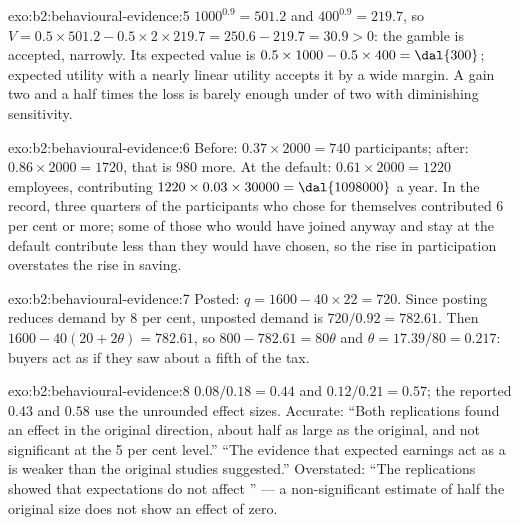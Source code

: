 \begin{solution}{exo:b2:behavioural-evidence:5}
$1000^{0.9} = 501.2$ and $400^{0.9} = 219.7$, so $V = 0.5 \times 501.2 - 0.5 \times 2 \times 219.7 = 250.6
- 219.7 = 30.9 > 0$: the gamble is accepted, narrowly. Its expected value is $0.5 \times 1000 - 0.5
\times 400 = \dal{300}$; expected utility with a nearly linear utility accepts it by a wide margin. A
gain two and a half times the loss is barely enough under  of two with diminishing
sensitivity.
\end{solution}

\begin{solution}{exo:b2:behavioural-evidence:6}
Before: $0.37 \times 2000 = 740$ participants; after: $0.86 \times 2000 = 1720$, that is 980 more. At the
default: $0.61 \times 2000 = 1220$ employees, contributing $1220 \times 0.03 \times 30000 = \dal{1098000}$
a year. In the record, three quarters of the participants who chose for themselves contributed 6 per
cent or more; some of those who would have joined anyway and stay at the default contribute less than
they would have chosen, so the rise in participation overstates the rise in saving.
\end{solution}

\begin{solution}{exo:b2:behavioural-evidence:7}
Posted: $q = 1600 - 40 \times 22 = 720$. Since posting reduces demand by 8 per cent, unposted demand is
$720/0.92 = 782.61$. Then $1600 - 40(20 + 2\theta) = 782.61$, so $800 - 782.61 = 80\theta$ and $\theta =
17.39/80 = 0.217$: buyers act as if they saw about a fifth of the tax.
\end{solution}

\begin{solution}{exo:b2:behavioural-evidence:8}
$0.08/0.18 = 0.44$ and $0.12/0.21 = 0.57$; the reported $0.43$ and $0.58$ use the unrounded effect
sizes. Accurate: ``Both replications found an effect in the original direction, about half as large as
the original, and not significant at the 5 per cent level.'' ``The evidence that expected earnings act
as a  is weaker than the original studies suggested.'' Overstated: ``The replications
showed that expectations do not affect '' --- a non-significant estimate of half the
original size does not show an effect of zero.
\end{solution}

